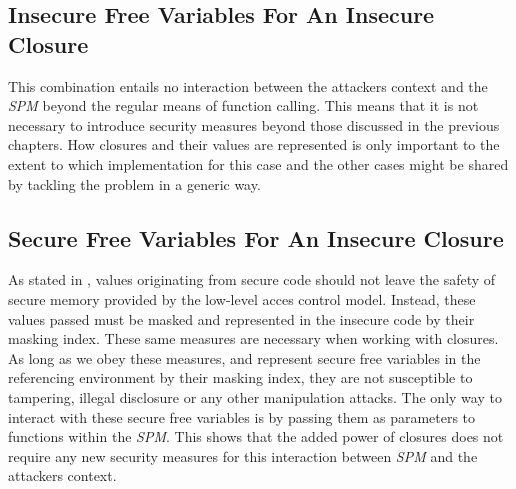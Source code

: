 \documentclass[10pt,a4paper,master=cws, masteroption=ai,english,inputenc=utf8]{kulemt}
\begin{document}


\subsection{Insecure Free Variables For An Insecure Closure}

This combination entails no interaction between the attackers context and the \emph{SPM} beyond the regular means of function calling.
This means that it is not necessary to introduce security measures beyond those discussed in the previous chapters.
How closures and their values are represented is only important to the extent to which implementation for this case and the other cases might be shared by tackling the problem in a generic way.

\subsection{Secure Free Variables For An Insecure Closure}

As stated in , values originating from secure code should not leave the safety of secure memory provided by the low-level acces control model.
Instead, these values passed must be masked and represented in the insecure code by their masking index.
These same measures are necessary when working with closures.
As long as we obey these measures, and represent secure free variables in the referencing environment by their masking index, they are not susceptible to tampering, illegal disclosure or any other manipulation attacks.
The only way to interact with these secure free variables is by passing them as parameters to functions within the \emph{SPM}.
This shows that the added power of closures does not require any new security measures for this interaction between \emph{SPM} and the attackers context.

\end{document}
